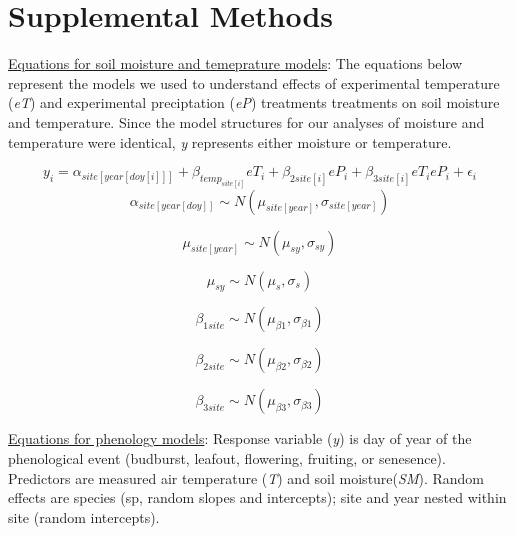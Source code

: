 \documentclass{article}
\begin{document}
\begin{singlespace}
\end{singlespace}


\clearpage

\section* {Supplemental Methods}
\underline{Equations for soil moisture and temeprature models}: 
The equations below represent the models we used to understand effects of experimental temperature (\textit{eT}) and experimental preciptation (\textit{eP}) treatments treatments on soil moisture and temperature. Since the model structures for our analyses of moisture and temperature were identical, \textit{y} represents either moisture or temperature. 

\begin{equation}
y_{i}=\alpha_{site[year[doy[i]]]}+ \beta_{temp_{site[i]}}eT_i+\beta_{2 site[i]}eP_i+\beta_{3 site[i]}eT_ieP_i+\epsilon_{i}\label{eq:1}
\end{equation}
\begin{equation}
\alpha_{site[year[doy]]}\sim N(\mu_{site[year]}, \sigma_{site[year]})\label{eq:2}
\end{equation}

\begin{equation}
\mu_{site[year]} \sim N(\mu_{sy}, \sigma_{sy})\label{eq:3}
\end{equation}

\begin{equation}
\mu_{sy} \sim N(\mu_{s}, \sigma_{s})\label{eq:4}
\end{equation}

\begin{equation}
\beta_{1 site} \sim N(\mu_{\beta1}, \sigma_{\beta1})\label{eq:5}
\end{equation}

\begin{equation}
\beta_{2 site} \sim N(\mu_{\beta2}, \sigma_{\beta2})\label{eq:6}
\end{equation}

\begin{equation}
\beta_{3 site} \sim N(\mu_{\beta3}, \sigma_{\beta3})\label{eq:7}
\end{equation}


\underline{Equations for phenology models}: 
 Response variable (\textit{y}) is day of year of the phenological event (budburst, leafout, flowering, fruiting, or senesence). Predictors are measured air temperature (\textit{T}) and soil moisture(\textit{SM}). Random effects are species (sp, random slopes and intercepts); site and year nested within site (random intercepts).
\end{document}
